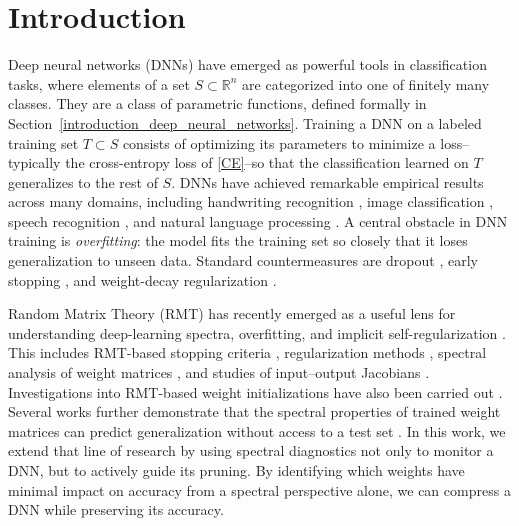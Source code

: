 \documentclass[11pt]{article}
\theoremstyle{plain}
\theoremstyle{definition}
\theoremstyle{remark}
\newcommand{\R}{\mathbb{R}}
\newcommand{\1}{\mathbf{1}}
\begin{document}
\tableofcontents

\section{Introduction}

Deep neural networks (DNNs) have emerged as powerful tools in classification tasks, where elements of a set \(S \subset \R^n\) are categorized into one of finitely many classes.  They are a class of parametric functions, defined formally in Section~\ref{introduction_deep_neural_networks}.  Training a DNN on a labeled training set \(T \subset S\) consists of optimizing its parameters to minimize a loss--typically the cross-entropy loss of \eqref{CE}--so that the classification learned on \(T\) generalizes to the rest of \(S\).  DNNs have achieved remarkable empirical results across many domains, including handwriting recognition \cite{LBD}, image classification \cite{krizhevsky2017imagenet}, speech recognition \cite{hinton2012deep}, and natural language processing \cite{sutskever2014sequence}.  A central obstacle in DNN training is \emph{overfitting}: the model fits the training set so closely that it loses generalization to unseen data.  Standard countermeasures are dropout \cite{srivastava2014dropout}, early stopping \cite{prechelt2012early}, and weight-decay regularization \cite{Park2023}.

Random Matrix Theory (RMT) has recently emerged as a useful lens for understanding deep-learning spectra, overfitting, and implicit self-regularization \cite{martin2021implicit,mahoney2019traditional}.  This includes RMT-based stopping criteria \cite{meng2023impact}, regularization methods \cite{xiao2023heavy}, spectral analysis of weight matrices \cite{thamm2022random}, and studies of input--output Jacobians \cite{pastur2020random,pastur2023random}.  Investigations into RMT-based weight initializations have also been carried out \cite{saada2023initialisation}.  Several works further demonstrate that the spectral properties of trained weight matrices can predict generalization without access to a test set \cite{martin2021predicting,martin2020heavy}.  In this work, we extend that line of research by using spectral diagnostics not only to monitor a DNN, but to actively guide its pruning.  By identifying which weights have minimal impact on accuracy from a spectral perspective alone, we can compress a DNN while preserving its accuracy.
\end{document}
